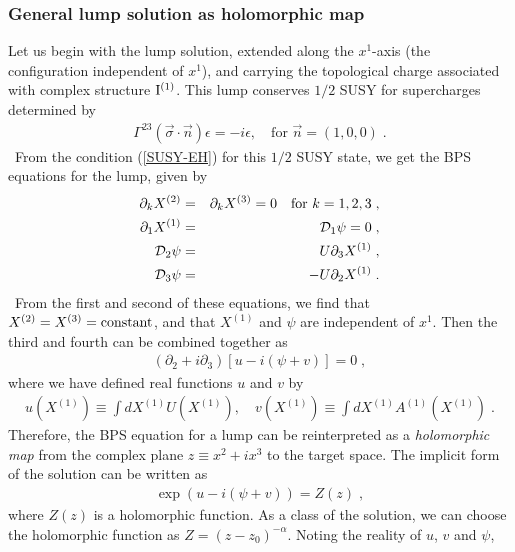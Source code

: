 \documentclass[a4paper,12pt]{article}
\begin{document}
\subsubsection{General lump solution as holomorphic map}
Let us begin with the lump solution, 
extended along the $x^1$-axis 
(the configuration independent of $x^1$), 
and carrying the topological charge associated with complex 
structure ${\rm I}^{(1)}$.
This lump conserves $1/2$ SUSY for supercharges 
determined by 
\begin{eqnarray}
 \Gamma^{23}(\vec{\sigma}\cdot \vec{n})\epsilon = -i\epsilon, \quad 
 \mbox{for} \,\, \vec{n}=(1,0,0) \;. 
\end{eqnarray} 
~From the condition (\ref{SUSY-EH}) for this $1/2$ SUSY state, 
we get the BPS equations for the lump, given by  
\begin{eqnarray}
  \partial_k X^{(2)} &=& \partial_k X^{(3)} = 0 \quad 
  \mbox{for} \,\, k=1,2,3 \;,\nonumber \\
  \partial_1 X^{(1)} &=& {\cal D}_1 \psi = 0 \;,\nonumber \\
  {\cal D}_2\psi &=& U\partial_3X^{(1)} \;,\nonumber \\
  {\cal D}_3\psi &=& -U\partial_2X^{(1)} \;.
\label{1/2BPSeq}
\end{eqnarray}
~From the first and second of these equations, 
we find that $X^{(2)}=X^{(3)}= {\rm constant}$, 
and that $X^{(1)}$ and $\psi$ are independent of $x^1$.
Then the third and fourth can be combined together as
\begin{eqnarray}
(\partial_2+i\partial_3)[u-i(\psi+v)]=0 \;,
\end{eqnarray}
where we have defined real functions $u$ and $v$ by 
\begin{eqnarray}
 u(X^{(1)})\equiv \int dX^{(1)}U(X^{(1)}), \quad 
 v(X^{(1)})\equiv \int dX^{(1)}A^{(1)}(X^{(1)}) \;.
\label{uandv}
\end{eqnarray}
Therefore, the BPS equation for a lump 
can be reinterpreted as a {\it holomorphic map} from 
the complex plane $z \equiv x^2 + i x^3$ to the target space.  
The implicit form of the solution can be written as
\begin{eqnarray}
  \exp (u-i(\psi+v)) = Z(z) \;,%
\end{eqnarray} 
where $Z(z)$ is a holomorphic function.
As a class of the solution, 
we can choose the holomorphic function as  
$Z=(z-z_0)^{-\alpha}$. 
Noting the reality of $u$, $v$ and $\psi$, 
\end{document}
